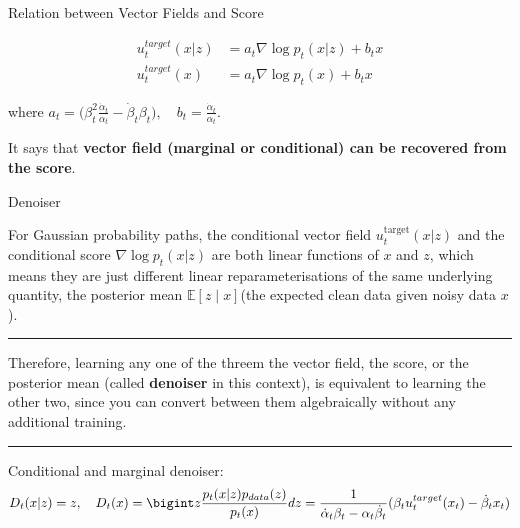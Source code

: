 \documentclass[aspectratio=169,xcolor=dvipsnames,svgnames,x11names,fleqn]{beamer}
\begin{document}
\begin{frame}{Relation between Vector Fields and Score}

    \begin{align*}
        u_t^{target}(x | z) & = a_t \nabla \log p_t(x|z) + b_t x\\
        u_t^{target}(x) & = a_t \nabla \log p_t(x) + b_t x
    \end{align*}

    where $a_t = \bigg ( \beta_t^2 \frac{\dot{\alpha}_t}{\alpha_t} - \dot{\beta}_t\beta_t \bigg), \quad b_t = \frac{\dot{\alpha}_t}{\alpha_t}$.
    
    \vspace{5pt}

    It says that \textbf{vector field (marginal or conditional) can be recovered from the score}.
\end{frame}

\begin{frame}{Denoiser}

    \footnotesize

    For Gaussian probability paths, the conditional vector field $u_t^\text{target}(x|z)$ and the conditional score $\nabla \log p_t(x|z)$ are both linear functions of $x$
and $z$, which means they are just different linear reparameterisations of the same underlying quantity, the posterior mean $\mathbb{E}[z \mid x]$(the expected clean data given noisy data $x$).

\vspace{10pt}

{\color{androidPurple}\hrule}

\vspace{10pt}

Therefore, learning any one of the threem the vector field, the score, or the posterior mean (called \textbf{denoiser} in this context), is equivalent to learning the other two, since you can convert between them algebraically without any additional training.

\vspace{10pt}

{\color{androidPurple}\hrule}

\vspace{10pt}

Conditional and marginal denoiser:
\begin{align*}
    D_t(x|z) = z, \quad D_t(x) = \bigint z \frac{p_t(x|z)p_{data}(z)}{p_t(x)}dz  = \frac{1}{\dot{\alpha}_t \beta_t - \alpha_t \dot{\beta}_t}(\beta_t u_t^{target}(x_t) - \dot{\beta}_t x_t)
\end{align*}
    
\end{frame}
\end{document}
